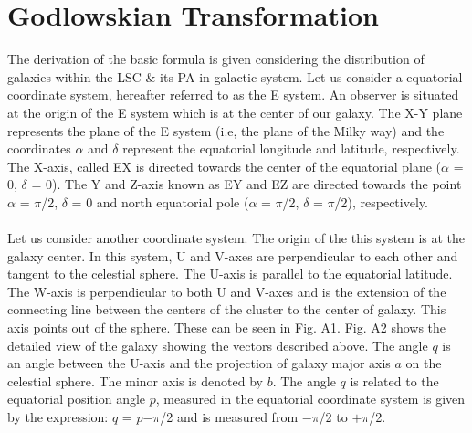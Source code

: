\chapter{Godlowskian Transformation}\label{God}
The derivation of the basic formula is given considering the
distribution of galaxies within the LSC \& its PA in galactic
system. Let us consider a equatorial coordinate system, hereafter
referred to as the E system. An observer is situated at the origin
of the E system which is at the center of our galaxy. The X-Y
plane represents the plane of the E system (i.e, the plane of the
Milky way) and the coordinates $\alpha$ and $\delta$ represent the
equatorial longitude and latitude, respectively. The X-axis,
called EX is directed towards the center of the equatorial plane
($\alpha$ = 0, $\delta$ = 0). The Y and Z-axis known as EY and EZ
are directed towards the point $\alpha$ = $\pi$/2, $\delta$ = 0
and north equatorial pole ($\alpha$ = $\pi$/2, $\delta$ =
$\pi$/2), respectively.
\\
\\
Let us consider another coordinate system. The origin of the this
system is at the galaxy center. In this system, U and V-axes are
perpendicular to each other and tangent to the celestial sphere.
The U-axis is parallel to the equatorial latitude. The W-axis is
perpendicular to both U and V-axes and is the extension of the
connecting line between the centers of the cluster to the center
of galaxy. This axis points out of the sphere. These can be seen
in Fig. A1. Fig. A2 shows the detailed view of the galaxy
showing the vectors described above. The angle $q$ is an angle
between the U-axis and the projection of galaxy major axis $a$ on
the celestial sphere. The minor axis is denoted by $b$. The angle
$q$ is related to the equatorial position angle $p$, measured in
the equatorial coordinate system is given by the expression: $q$ =
$p$$-$$\pi$/2 and is measured from $-$$\pi$/2 to $+$$\pi$/2.
\\\\
